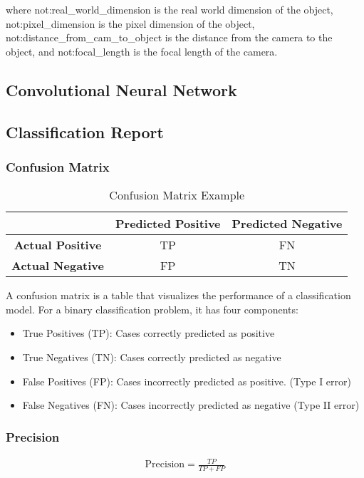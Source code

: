 where \gls{not:real_world_dimension} is the real world dimension of the object,
 \gls{not:pixel_dimension} is the pixel dimension of the object, 
 \gls{not:distance_from_cam_to_object} is the distance from the camera to the object,
  and \gls{not:focal_length} is the focal length of the camera.

\subsection{Convolutional Neural Network}

\subsection{Classification Report}

\subsubsection{Confusion Matrix}
\begin{table}[h]
	\centering
	\begin{tabular}{c|c|c}
	\hline
	& \textbf{Predicted Positive} & \textbf{Predicted Negative} \\
	\hline
	\textbf{Actual Positive} & TP & FN \\
	\hline
	\textbf{Actual Negative} & FP & TN \\
	\hline
	\end{tabular}
	\caption{Confusion Matrix Example}
	\label{tab:confusion_matrix}
\end{table}
A confusion matrix is a table that visualizes the performance 
of a classification model. For a binary classification problem, it has four components:
\begin{itemize}
	\item True Positives (TP): Cases correctly predicted as positive
	\item True Negatives (TN): Cases correctly predicted as negative
	\item False Positives (FP): Cases incorrectly predicted as positive. (Type I error)
	\item False Negatives (FN): Cases incorrectly predicted as negative (Type II error)
\end{itemize}

\subsubsection{Precision}
\begin{eqnarray}
	\text{Precision} = \frac{TP}{TP + FP}
	\label{eq:precision}
\end{eqnarray}

